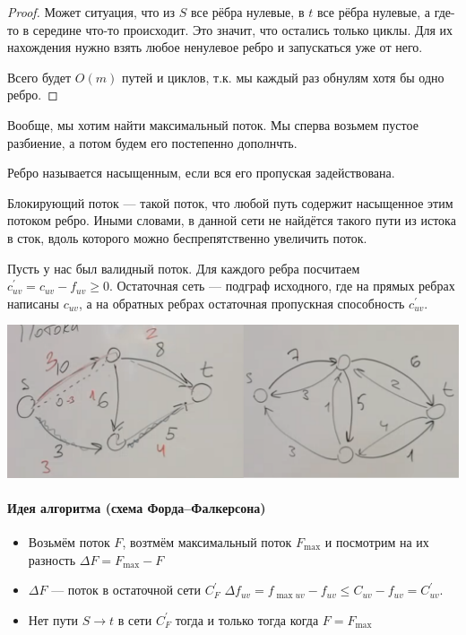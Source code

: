 \begin{proof}
    Может ситуация, что из $S$ все рёбра нулевые, в $t$ все рёбра нулевые, а где-то в середине что-то происходит. 
    Это значит, что остались только циклы. Для их нахождения нужно взять любое ненулевое ребро и запускаться уже от него.

    Всего будет $O(m)$ путей и циклов, т.к. мы каждый раз обнулям хотя бы одно ребро.
\end{proof}

Вообще, мы хотим найти максимальный поток. Мы сперва возьмем пустое разбиение, а потом будем его постепенно дополнчть.

\begin{definition}
    Ребро называется насыщенным, если вся его пропуская задействована. 
\end{definition}

\begin{definition}
    Блокирующий поток --- такой поток, что любой путь содержит насыщенное этим потоком ребро. Иными словами, в данной сети не найдётся такого пути из истока в сток, вдоль которого можно беспрепятственно увеличить поток.
\end{definition}

\begin{definition}
    Пусть у нас был валидный поток. Для каждого ребра посчитаем $c_{uv}^\prime = c_{uv} - f_{uv} \geqslant 0$. Остаточная сеть --- подграф исходного, где на прямых ребрах написаны $c_{uv}$, а на обратных ребрах остаточная пропускная способность $c_{uv}^\prime$.  
    
    \begin{center}
        \includegraphics[scale=0.37]{img/flows_rest_network.png}
    \end{center}
\end{definition}

\paragraph*{Идея алгоритма (схема Форда--Фалкерсона)}
\begin{itemize}
    \item Возьмём поток $F$, возтмём максимальный поток $F_{\max}$ и посмотрим на их разность $\Delta F = F_{\max} - F$
    \item
    $\Delta F$ --- поток в остаточной сети $C_{F}^\prime$
    $\Delta f_{uv} = f_{\max uv} - f_{uv} \leqslant C_{uv} - f_{uv} = C_{uv}^\prime$.
    \item Нет пути $S \to t$ в сети $C_F^\prime$ тогда и только тогда когда $F = F_{\max}$
\end{itemize}


